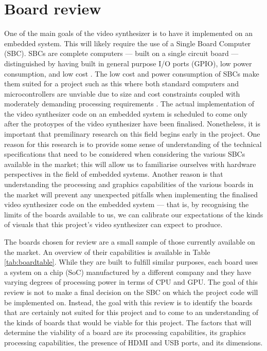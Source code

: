 \documentclass[../main_report1.tex]{subfiles}
\begin{document}
\section{Board review}\label{sec:boardreview}
One of the main goals of the video synthesizer is to have it implemented on an embedded system. This will likely require the use of a Single Board Computer (SBC). SBCs are complete computers --- built on a single circuit board --- distinguished by having built in general purpose I/O ports (GPIO), low power consumption, and low cost \cite{Johnston2018}. The low cost and power consumption of SBCs make them suited for a project such as this where both standard computers and microcontrollers are unviable due to size and cost constraints coupled with moderately demanding processing requirements \cite{Johnston2018}. The actual implementation of the video synthesizer code on an embedded system is scheduled to come only after the protoypes of the video synthesizer have been finalised. Nonetheless, it is important that premilinary research on this field begins early in the project. One reason for this research is to provide some sense of understanding of the technical specifications that need to be considered when considering the various SBCs available in the market; this will allow us to familiarise ourselves with hardware perspectives in the field of embedded systems. Another reason is that understanding the processing and graphics capabilities of the various boards in the market will prevent any unexpected pitfalls when implementing the finalised video synthesizer code on the embedded system --- that is, by recognising the limits of the boards available to us, we can calibrate our expectations of the kinds of visuals that this project's video synthesizer can expect to produce. \par

The boards chosen for review are a small sample of those currently available on the market. An overview of their capabilities is available in Table \ref{tab:boardtable}. While they are built to fulfill similar purposes, each board uses a system on a chip (SoC) manufactured by a different company and they have varying degrees of processing power in terms of CPU and GPU. The goal of this review is not to make a final decision on the SBC on which the project code will be implemented on. Instead, the goal with this review is to identify the boards that are certainly not suited for this project and to come to an understanding of the kinds of boards that would be viable for this project. The factors that will determine the viability of a board are its processing capabilities, its graphics processing capabilities, the presence of HDMI and USB ports, and its dimensions. \par
\end{document}
